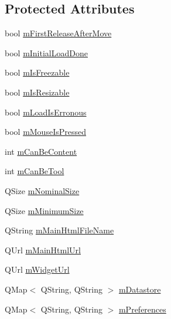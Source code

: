 \subsection*{Protected Attributes}
\begin{DoxyCompactItemize}
\item 
bool \hyperlink{class_u_b_graphics_widget_item_ad523ba7198b6e62fd6dc3928e8066d00}{m\-First\-Release\-After\-Move}
\item 
bool \hyperlink{class_u_b_graphics_widget_item_a3b2df2c11c6c54109d409d3e3741e937}{m\-Initial\-Load\-Done}
\item 
bool \hyperlink{class_u_b_graphics_widget_item_a7dc13bd68e90e669b7b6537a77a40491}{m\-Is\-Freezable}
\item 
bool \hyperlink{class_u_b_graphics_widget_item_a1ef7d9bd5a948e5055de3590e72c386c}{m\-Is\-Resizable}
\item 
bool \hyperlink{class_u_b_graphics_widget_item_a87aaf594b4fc01d929d647cb91cbf0b3}{m\-Load\-Is\-Erronous}
\item 
bool \hyperlink{class_u_b_graphics_widget_item_a353f7366b1ec5c5cd8887583ba9cb633}{m\-Mouse\-Is\-Pressed}
\item 
int \hyperlink{class_u_b_graphics_widget_item_a5607745b32395b4a2f4221f1b38ff372}{m\-Can\-Be\-Content}
\item 
int \hyperlink{class_u_b_graphics_widget_item_a6c0299a111de126205f1dc4a6666a42b}{m\-Can\-Be\-Tool}
\item 
Q\-Size \hyperlink{class_u_b_graphics_widget_item_ae2c6c421328a101398332186bd3fcfb8}{m\-Nominal\-Size}
\item 
Q\-Size \hyperlink{class_u_b_graphics_widget_item_ab49ce559c020b3c8e57cca0a708669ac}{m\-Minimum\-Size}
\item 
Q\-String \hyperlink{class_u_b_graphics_widget_item_a9fd68562fc5e30285a919efda444ba23}{m\-Main\-Html\-File\-Name}
\item 
Q\-Url \hyperlink{class_u_b_graphics_widget_item_aaf3a0394d38e8b1c3998b012411ce98f}{m\-Main\-Html\-Url}
\item 
Q\-Url \hyperlink{class_u_b_graphics_widget_item_a4066b298b5119e0058f5f12282322ffa}{m\-Widget\-Url}
\item 
Q\-Map$<$ Q\-String, Q\-String $>$ \hyperlink{class_u_b_graphics_widget_item_afcd938be72e65d4517c96df6841796f0}{m\-Datastore}
\item 
Q\-Map$<$ Q\-String, Q\-String $>$ \hyperlink{class_u_b_graphics_widget_item_aef3b6f64a7f5c8e7c67b7e9645052658}{m\-Preferences}
\end{DoxyCompactItemize}


